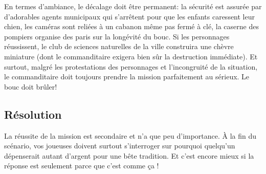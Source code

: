 En termes d'ambiance, le décalage doit être permanent: la sécurité est assurée par d'adorables agents municipaux qui s'arrêtent pour que les enfants caressent leur chien, les caméras sont reliées à un cabanon même pas fermé à clé, la caserne des pompiers organise des paris sur la longévité du bouc.
Si les personnages réussissent, le club de sciences naturelles de la ville construira une chèvre miniature (dont le commanditaire exigera bien sûr la destruction immédiate).
Et surtout, malgré les protestations des personnages et l'incongruité de la situation, le commanditaire doit toujours prendre la mission parfaitement au sérieux. Le bouc doit brûler!

\subsection{Résolution}

La réussite de la mission est secondaire et n'a que peu d'importance.
À la fin du scénario, vos joueuses doivent surtout s'interroger sur \og pourquoi \fg quelqu'un dépenserait autant d'argent pour une bête tradition.
Et c'est encore mieux si la réponse est seulement \og parce que c'est comme ça \fg!

